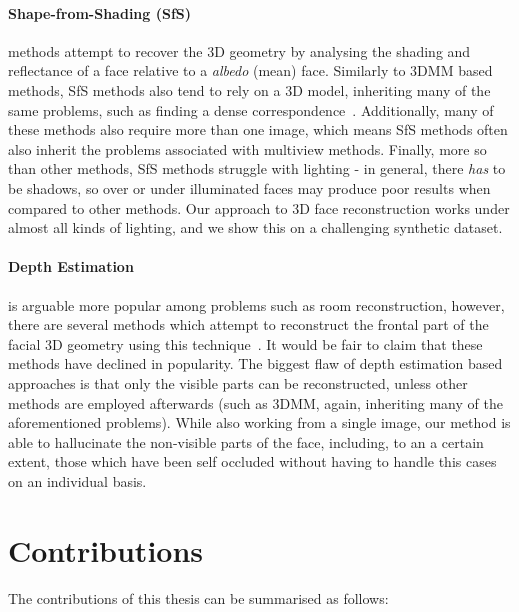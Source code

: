 \paragraph{Shape-from-Shading (SfS)} methods attempt to recover the 3D
geometry by analysing the shading and reflectance of a face relative
to a \textit{albedo} (mean) face. Similarly to 3DMM based methods, SfS
methods also tend to rely on a 3D model, inheriting many of the same
problems, such as finding a dense
correspondence~\cite{suwajanakorn2014total,jiang20183d}. Additionally,
many of these methods also require more than one image, which means
SfS methods often also inherit the problems associated with multiview
methods. Finally, more so than other methods, SfS methods struggle
with lighting - in general, there \textit{has} to be shadows, so over
or under illuminated faces may produce poor results when compared to
other methods. Our approach to 3D face reconstruction works under
almost all kinds of lighting, and we show this on a challenging
synthetic dataset.

\paragraph{Depth Estimation} is arguable more popular among problems
such as room reconstruction, however, there are several methods which
attempt to reconstruct the frontal part of the facial 3D geometry
using this technique~\cite{sun2011depth,sun2013depth}. It would be
fair to claim that these methods have declined in popularity. The
biggest flaw of depth estimation based approaches is that only the
visible parts can be reconstructed, unless other methods are employed
afterwards (such as 3DMM, again, inheriting many of the aforementioned
problems). While also working from a single image, our method is able
to hallucinate the non-visible parts of the face, including, to an a
certain extent, those which have been self occluded without having to
handle this cases on an individual basis.

\section{Contributions}

The contributions of this thesis can be summarised as follows:

